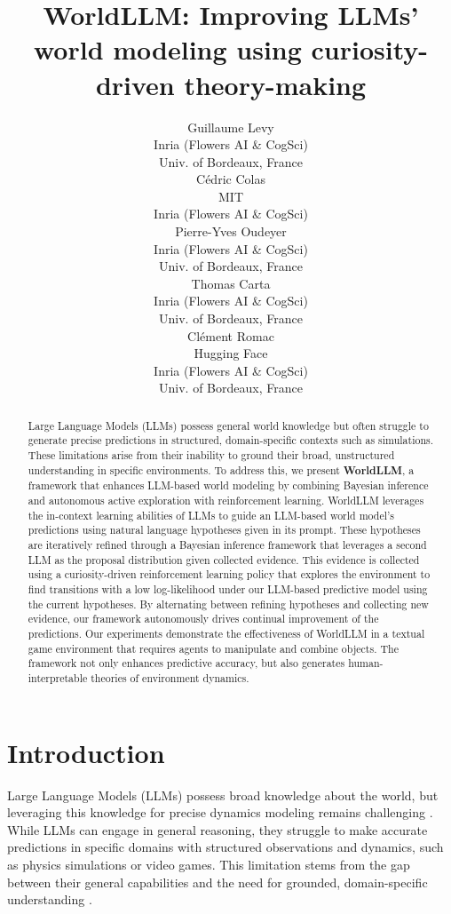 \documentclass{article}
\title{WorldLLM: Improving LLMs' world modeling using curiosity-driven theory-making}
\author{
Guillaume Levy\\
Inria (Flowers AI \& CogSci)\\
Univ. of Bordeaux, France\\
\And
Cédric Colas \\
MIT \\
Inria (Flowers AI \& CogSci) \\
\And Pierre-Yves Oudeyer\\
Inria (Flowers AI \& CogSci)\\
Univ. of Bordeaux, France\\
\And
Thomas Carta\\
Inria (Flowers AI \& CogSci)\\
Univ. of Bordeaux, France\\
\And
Clément Romac\\
Hugging Face \\
Inria (Flowers AI \& CogSci)\\
Univ. of Bordeaux, France\\
}
\begin{document}
\maketitle

\begin{abstract}
Large Language Models (LLMs) possess general world knowledge but often struggle to generate precise predictions in structured, domain-specific contexts such as simulations. These limitations arise from their inability to ground their broad, unstructured understanding in specific environments. To address this, we present \textbf{WorldLLM}, a framework that enhances LLM-based world modeling by combining Bayesian inference and autonomous active exploration with reinforcement learning. WorldLLM leverages the in-context learning abilities of LLMs to guide an LLM-based world model's predictions using natural language hypotheses given in its prompt. These hypotheses are iteratively refined through a Bayesian inference framework that leverages a second LLM as the proposal distribution given collected evidence. This evidence is collected using a curiosity-driven reinforcement learning policy that explores the environment to find transitions with a low log-likelihood under our LLM-based predictive model using the current hypotheses. By alternating between refining hypotheses and collecting new evidence, our framework autonomously drives continual improvement of the predictions. Our experiments demonstrate the effectiveness of WorldLLM in a textual game environment that requires agents to manipulate and combine objects. The framework not only enhances predictive accuracy, but also generates human-interpretable theories of environment dynamics. 
\end{abstract}


\section{Introduction}
Large Language Models (LLMs) possess broad knowledge about the world, but leveraging this knowledge for precise dynamics modeling remains challenging \citep{vafa_evaluating_2024}. While LLMs can engage in general reasoning, they struggle to make accurate predictions in specific domains with structured observations and dynamics, such as physics simulations or video games. This limitation stems from the gap between their general capabilities and the need for grounded, domain-specific understanding \citep{carta_grounding_2023, cross_hypothetical_2024, bender_climbing_2020}.
\end{document}

